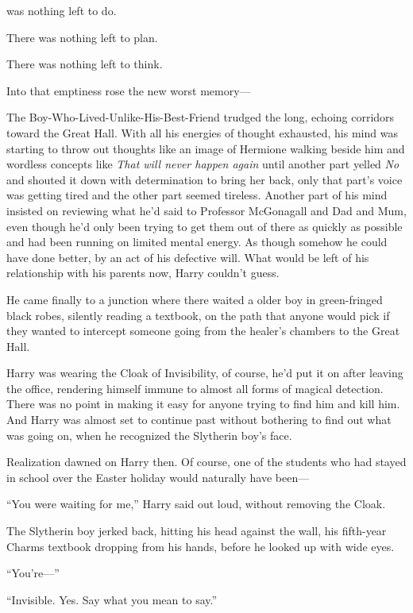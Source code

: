 
 was nothing left to do.

\hplettrineextrapara
There was nothing left to plan.

There was nothing left to think.

Into that emptiness rose the new worst memory—

The Boy-Who-Lived-Unlike-His-Best-Friend trudged the long, echoing corridors toward the Great Hall. With all his energies of thought exhausted, his mind was starting to throw out thoughts like an image of Hermione walking beside him and wordless concepts like \emph{That will never happen again} until another part yelled \emph{No} and shouted it down with determination to bring her back, only that part’s voice was getting tired and the other part seemed tireless. Another part of his mind insisted on reviewing what he’d said to Professor McGonagall and Dad and Mum, even though he’d only been trying to get them out of there as quickly as possible and had been running on limited mental energy. As though somehow he could have done better, by an act of his defective will. What would be left of his relationship with his parents now, Harry couldn’t guess.

He came finally to a junction where there waited a older boy in green-fringed black robes, silently reading a textbook, on the path that anyone would pick if they wanted to intercept someone going from the healer’s chambers to the Great Hall.

Harry was wearing the Cloak of Invisibility, of course, he’d put it on after leaving the office, rendering himself immune to almost all forms of magical detection. There was no point in making it easy for anyone trying to find him and kill him. And Harry was almost set to continue past without bothering to find out what was going on, when he recognized the Slytherin boy’s face.

Realization dawned on Harry then. Of course, one of the students who had stayed in school over the Easter holiday would naturally have been—

“You were waiting for me,” Harry said out loud, without removing the Cloak.

The Slytherin boy jerked back, hitting his head against the wall, his fifth-year Charms textbook dropping from his hands, before he looked up with wide eyes.

“You’re—”

“Invisible. Yes. Say what you mean to say.”

